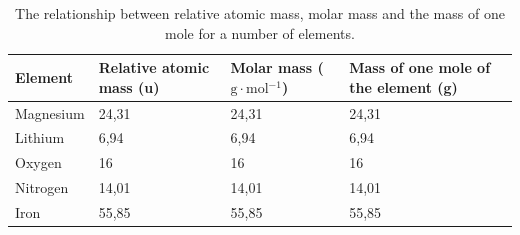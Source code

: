           \begin{table}[H]
        \begin{center}
      \label{m38717*uid11}
    \noindent
      \begin{tabular}{|l|l|l|p{3cm}|}\hline
                \textbf{Element}
               &
                \textbf{Relative atomic mass (u)}
               &
                \textbf{Molar mass ($\text{g}\ensuremath{\cdot}\text{mol}{}^{-1}$)}
               &
                \textbf{Mass of one mole of the element (g)} \\ \hline
        Magnesium &
        24,31 &
        24,31 &
        24,31 \\ \hline
        Lithium &
        6,94 &
        6,94 &
        6,94 \\ \hline
        Oxygen &
        16 &
        16 &
        16 \\ \hline
        Nitrogen &
        14,01 &
        14,01 &
        14,01  \\ \hline
        Iron &
        55,85 &
        55,85 &
        55,85 \\ \hline
    \end{tabular}
      \end{center}
    \caption{The relationship between relative atomic mass, molar mass and the mass of one mole for a number of elements.}
\end{table}


